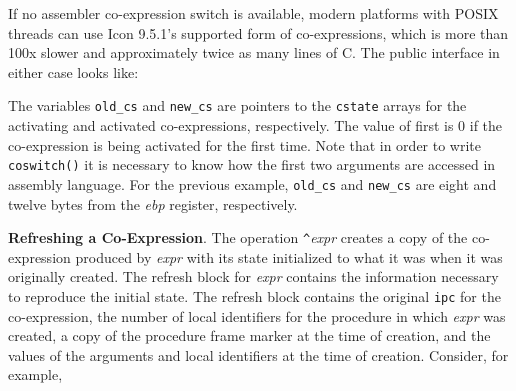 If no assembler co-expression switch is available, modern platforms
with POSIX threads can use Icon 9.5.1's supported form of
co-expressions, which is more than 100x slower and approximately twice
as many lines of C. The public interface in either case looks like:


The variables \texttt{old\_cs} and \texttt{new\_cs} are pointers to
the \texttt{cstate} arrays for the activating and activated
co-expressions, respectively. The value of first is 0 if the
co-expression is being activated for the first time. Note that in
order to write \texttt{coswitch()} it is necessary to know how the
first two arguments are accessed in assembly language. For the
previous example, \texttt{old\_cs} and \texttt{new\_cs} are eight and
twelve bytes from the \textit{ebp }register, respectively.

\textbf{Refreshing a Co-Expression}. The operation
\texttt{\textit{\^{}}}\textit{expr} creates a copy of
the co-expression produced by \textit{expr} with its
state initialized to what it was when it was originally created. The
refresh block for \textit{expr} contains the
information necessary to reproduce the initial state. The refresh
block contains the original \texttt{ipc} for the co-expression, the
number of local identifiers for the procedure in which
\textit{expr} was created, a copy of the procedure
frame marker at the time of creation, and the values of the arguments
and local identifiers at the time of creation. Consider, for example,

\goodbreak
{}


